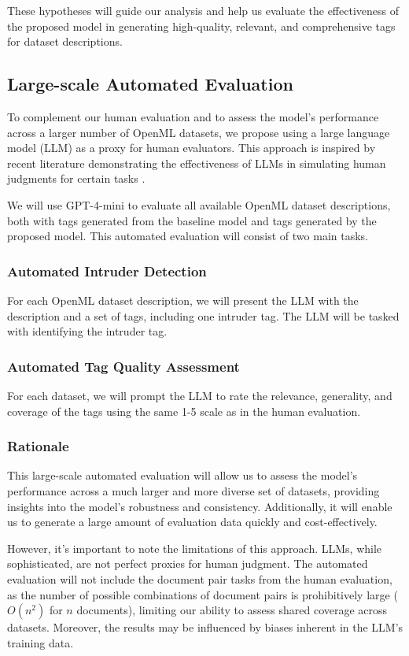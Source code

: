 These hypotheses will guide our analysis and help us evaluate the effectiveness of the proposed model in generating high-quality, relevant, and comprehensive tags for dataset descriptions.

\subsection{Large-scale Automated Evaluation}

To complement our human evaluation and to assess the model's performance across a larger number of OpenML datasets, we propose using a large language model (LLM) as a proxy for human evaluators. This approach is inspired by recent literature demonstrating the effectiveness of LLMs in simulating human judgments for certain tasks \cite{musil_exploring_2024}.

We will use GPT-4-mini to evaluate all available OpenML dataset descriptions, both with tags generated from the baseline model and tags generated by the proposed model. This automated evaluation will consist of two main tasks.

\subsubsection{Automated Intruder Detection}
For each OpenML dataset description, we will present the LLM with the description and a set of tags, including one intruder tag. The LLM will be tasked with identifying the intruder tag.

\subsubsection{Automated Tag Quality Assessment}
For each dataset, we will prompt the LLM to rate the relevance, generality, and coverage of the tags using the same 1-5 scale as in the human evaluation.

\subsubsection{Rationale}
This large-scale automated evaluation will allow us to assess the model's performance across a much larger and more diverse set of datasets, providing insights into the model's robustness and consistency. Additionally, it will enable us to generate a large amount of evaluation data quickly and cost-effectively.

However, it's important to note the limitations of this approach. LLMs, while sophisticated, are not perfect proxies for human judgment. The automated evaluation will not include the document pair tasks from the human evaluation, as the number of possible combinations of document pairs is prohibitively large ($O(n^2)$ for $n$ documents), limiting our ability to assess shared coverage across datasets. Moreover, the results may be influenced by biases inherent in the LLM's training data.


